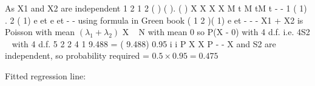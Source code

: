 \documentclass[a4paper,12pt]{article}
\begin{document}
 As X1 and X2 are independent
1 2 1 2
( ) ( ). ( ) X X X X M t M tM t -
-
1 ( 1) . 2 ( 1) e et e et -%
- using formula in Green book
( 1 2 )( 1) e et - %
-
- X1 + X2 is Poisson with mean $(\lambda_1 + \lambda_2)$
 X ~ N with mean 0 so P(X - 0)%
with 4 d.f. i.e. 4S2 ~ %
with 4 d.f.
5 2 2
4
1
9.488 = ( 9.488) 0.95 i
i
P X X P
-
%
-
X and S2 are independent, so probability required = $0.5 \times 0.95 = 0.475$

 Fitted regression line:
\end{document}
